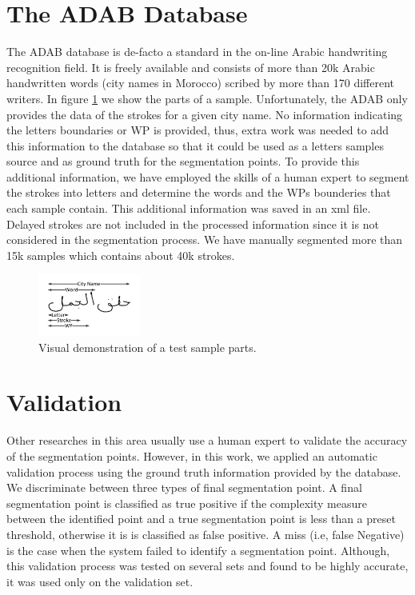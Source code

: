 \documentclass[journal,compsoc]{IEEEtran}
\begin{document}
\section{The ADAB Database}
\label{sec:database}
The ADAB database is de-facto a standard in the on-line Arabic handwriting recognition field. It is freely available and consists of more than 20k Arabic handwritten words (city names in Morocco) scribed by more than 170 different writers. 
In figure \ref{fig:sample_parts} we show the parts of a sample.
Unfortunately, the ADAB only provides the data of the strokes for a given city name. 
No information indicating the letters boundaries or WP is provided, thus, extra work was needed to add this information to the database so that it could be used as a letters samples source and as ground truth for the segmentation points.
To provide this additional information, we have employed the skills of a human expert to segment the strokes into letters and determine the words and the WPs bounderies that each sample contain. 
This additional information was saved in an xml file. Delayed strokes are not included in the processed information since it is not considered in the segmentation process.
We have manually segmented more than 15k samples which contains about 40k strokes. 

\begin{figure}
\centering
\includegraphics[width=0.3\textwidth]{./figures/sample_parts}
\caption{Visual demonstration of a test sample parts.}
\label{fig:sample_parts}
\end{figure}

\section{Validation}
\label{sec:validation}
Other researches in this area usually use a human expert to validate the accuracy of the segmentation points. However, in this work, we applied an automatic validation process using the ground truth information provided by the database. We discriminate between three types of final segmentation point. A final segmentation point is classified as true positive if the complexity measure between the identified point and a true segmentation point is less than a preset threshold, otherwise it is is classified as false positive. A miss (i.e, false Negative) is the case when the system failed to identify a segmentation point. Although, this validation process was tested on several sets and found to be highly accurate, it was used only on the validation set.
\end{document}
